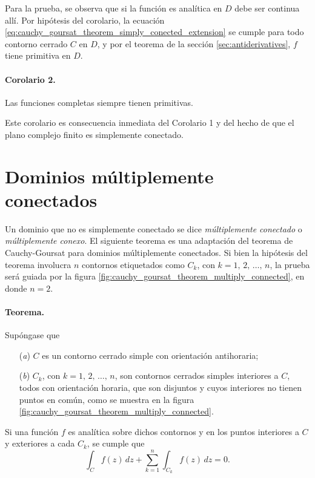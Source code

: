\documentclass[a4paper]{report}
\begin{document}
Para la prueba, se observa que si la función es analítica en \(D\) debe ser continua allí. Por hipótesis del corolario, la ecuación \ref{eq:cauchy_goursat_theorem_simply_conected_extension} se cumple para todo contorno cerrado \(C\) en \(D\), y por el teorema de la sección \ref{sec:antiderivatives}, \(f\) tiene primitiva en \(D\). 

\paragraph{Corolario 2.} Las funciones completas siempre tienen primitivas.

Este corolario es consecuencia inmediata del Corolario 1 y del hecho de que el plano complejo finito es simplemente conectado.

\section{Dominios múltiplemente conectados}\label{sec:multiply_connected_domains}

Un dominio que no es simplemente conectado se dice \emph{múltiplemente conectado} o \emph{múltiplemente conexo}. El siguiente teorema es una adaptación del teorema de Cauchy-Goursat para dominios múltiplemente conectados. Si bien la hipótesis del teorema involucra \(n\) contornos etiquetados como \(C_k\), con \(k=1,\,2,\,\dots,\,n\), la prueba será guiada por la figura \ref{fig:cauchy_goursat_theorem_multiply_connected}, en donde \(n=2\).

\paragraph{Teorema.} Supóngase que 
\begin{enumerate}
 \item[(\textit{a})] \(C\) es un contorno cerrado simple con orientación antihoraria;
 \item[(\textit{b})] \(C_k\), con \(k=1,\,2,\,\dots,\,n\), son contornos cerrados simples interiores a \(C\), todos con orientación horaria, que son disjuntos y cuyos interiores no tienen puntos en común, como se muestra en la figura \ref{fig:cauchy_goursat_theorem_multiply_connected}.
\end{enumerate}
Si una función \(f\) es analítica sobre dichos contornos y en los puntos interiores a \(C\) y exteriores a cada \(C_k\), se cumple que 
\begin{equation}\label{eq:cauchy_goursat_theorem_multiply_conected_extension}
 \int_Cf(z)\,dz+\sum_{k=1}^n\int_{C_k}f(z)\,dz=0. 
\end{equation}
\end{document}
